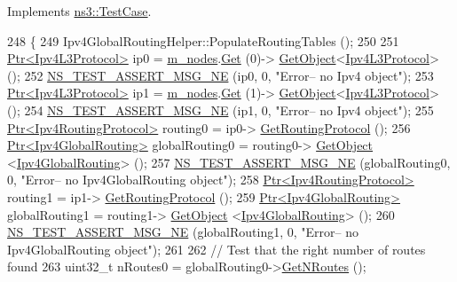 Implements \hyperlink{classns3_1_1TestCase_a8ff74680cf017ed42011e4be51917a24}{ns3\+::\+Test\+Case}.


\begin{DoxyCode}
248 \{
249   Ipv4GlobalRoutingHelper::PopulateRoutingTables ();
250 
251   \hyperlink{classns3_1_1Ptr}{Ptr<Ipv4L3Protocol>} ip0 = \hyperlink{classLanTest_aa89c8886b5180249409317603fe09577}{m\_nodes}.\hyperlink{classns3_1_1NodeContainer_a9ed96e2ecc22e0f5a3d4842eb9bf90bf}{Get} (0)->
      \hyperlink{classns3_1_1Object_a13e18c00017096c8381eb651d5bd0783}{GetObject}<\hyperlink{classns3_1_1Ipv4L3Protocol}{Ipv4L3Protocol}> ();
252   \hyperlink{group__testing_ga73d66fb0050a5111453fd144e767b91a}{NS\_TEST\_ASSERT\_MSG\_NE} (ip0, 0, \textcolor{stringliteral}{"Error-- no Ipv4 object"});  
253   \hyperlink{classns3_1_1Ptr}{Ptr<Ipv4L3Protocol>} ip1 = \hyperlink{classLanTest_aa89c8886b5180249409317603fe09577}{m\_nodes}.\hyperlink{classns3_1_1NodeContainer_a9ed96e2ecc22e0f5a3d4842eb9bf90bf}{Get} (1)->
      \hyperlink{classns3_1_1Object_a13e18c00017096c8381eb651d5bd0783}{GetObject}<\hyperlink{classns3_1_1Ipv4L3Protocol}{Ipv4L3Protocol}> ();
254   \hyperlink{group__testing_ga73d66fb0050a5111453fd144e767b91a}{NS\_TEST\_ASSERT\_MSG\_NE} (ip1, 0, \textcolor{stringliteral}{"Error-- no Ipv4 object"});  
255   \hyperlink{classns3_1_1Ptr}{Ptr<Ipv4RoutingProtocol>} routing0 = ip0->
      \hyperlink{classns3_1_1Ipv4L3Protocol_aa1e4efbf4978299e47406895c3f4b41d}{GetRoutingProtocol} ();
256   \hyperlink{classns3_1_1Ptr}{Ptr<Ipv4GlobalRouting>} globalRouting0 = routing0->
      \hyperlink{classns3_1_1Object_a13e18c00017096c8381eb651d5bd0783}{GetObject} <\hyperlink{classns3_1_1Ipv4GlobalRouting}{Ipv4GlobalRouting}> ();
257   \hyperlink{group__testing_ga73d66fb0050a5111453fd144e767b91a}{NS\_TEST\_ASSERT\_MSG\_NE} (globalRouting0, 0, \textcolor{stringliteral}{"Error-- no Ipv4GlobalRouting object"});  
258   \hyperlink{classns3_1_1Ptr}{Ptr<Ipv4RoutingProtocol>} routing1 = ip1->
      \hyperlink{classns3_1_1Ipv4L3Protocol_aa1e4efbf4978299e47406895c3f4b41d}{GetRoutingProtocol} ();
259   \hyperlink{classns3_1_1Ptr}{Ptr<Ipv4GlobalRouting>} globalRouting1 = routing1->
      \hyperlink{classns3_1_1Object_a13e18c00017096c8381eb651d5bd0783}{GetObject} <\hyperlink{classns3_1_1Ipv4GlobalRouting}{Ipv4GlobalRouting}> ();
260   \hyperlink{group__testing_ga73d66fb0050a5111453fd144e767b91a}{NS\_TEST\_ASSERT\_MSG\_NE} (globalRouting1, 0, \textcolor{stringliteral}{"Error-- no Ipv4GlobalRouting object"});  
261 
262   \textcolor{comment}{// Test that the right number of routes found}
263   uint32\_t nRoutes0 = globalRouting0->\hyperlink{classns3_1_1Ipv4GlobalRouting_abb9d2b3642272b9bd2697a5699922fa7}{GetNRoutes} ();

\end{DoxyCode}
